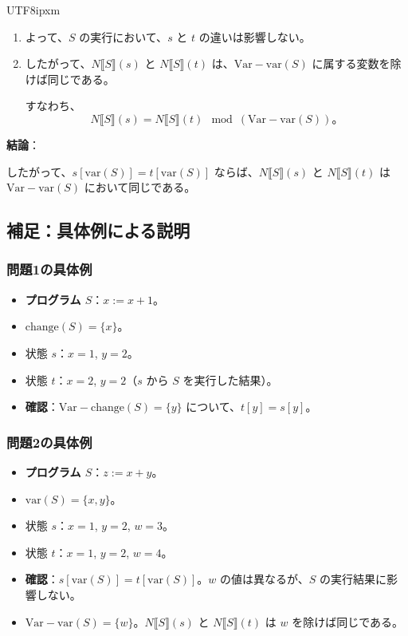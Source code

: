 \documentclass[12pt,a4paper]{article}
\begin{document}
\begin{CJK}{UTF8}{ipxm}
\begin{enumerate}
    \item よって、$S$ の実行において、$s$ と $t$ の違いは影響しない。

    \item したがって、$N\llbracket S \rrbracket (s)$ と $N\llbracket S \rrbracket (t)$ は、$\text{Var} - \text{var}(S)$ に属する変数を除けば同じである。

    すなわち、
    \[
    N\llbracket S \rrbracket (s) = N\llbracket S \rrbracket (t) \mod (\text{Var} - \text{var}(S))。
    \]

\end{enumerate}

\textbf{結論}：

したがって、$s[\text{var}(S)] = t[\text{var}(S)]$ ならば、$N\llbracket S \rrbracket (s)$ と $N\llbracket S \rrbracket (t)$ は $\text{Var} - \text{var}(S)$ において同じである。

\vspace{1em}

\subsection*{補足：具体例による説明}

\subsubsection*{問題1の具体例}

\begin{itemize}
    \item \textbf{プログラム $S$}：$x := x + 1$。
    \item $\text{change}(S) = \{ x \}$。
    \item 状態 $s$：$x = 1$, $y = 2$。
    \item 状態 $t$：$x = 2$, $y = 2$（$s$ から $S$ を実行した結果）。
    \item \textbf{確認}：$\text{Var} - \text{change}(S) = \{ y \}$ について、$t[y] = s[y]$。
\end{itemize}

\subsubsection*{問題2の具体例}

\begin{itemize}
    \item \textbf{プログラム $S$}：$z := x + y$。
    \item $\text{var}(S) = \{ x, y \}$。
    \item 状態 $s$：$x = 1$, $y = 2$, $w = 3$。
    \item 状態 $t$：$x = 1$, $y = 2$, $w = 4$。
    \item \textbf{確認}：$s[\text{var}(S)] = t[\text{var}(S)]$。$w$ の値は異なるが、$S$ の実行結果に影響しない。
    \item $\text{Var} - \text{var}(S) = \{ w \}$。$N\llbracket S \rrbracket (s)$ と $N\llbracket S \rrbracket (t)$ は $w$ を除けば同じである。
\end{itemize}


\end{CJK}
\end{document}
